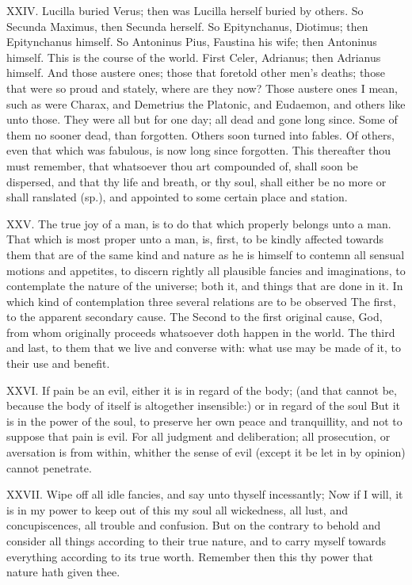 XXIV. Lucilla buried Verus; then was Lucilla herself buried by others.
So Secunda Maximus, then Secunda herself. So Epitynchanus, Diotimus; then
Epitynchanus himself. So Antoninus Pius, Faustina his wife; then Antoninus
himself. This is the course of the world. First Celer, Adrianus; then
Adrianus himself. And those austere ones; those that foretold other men's
deaths; those that were so proud and stately, where are they now? Those
austere ones I mean, such as were Charax, and Demetrius the Platonic, and
Eudaemon, and others like unto those. They were all but for one day; all
dead and gone long since. Some of them no sooner dead, than forgotten.
Others soon turned into fables. Of others, even that which was fabulous,
is now long since forgotten. This thereafter thou must remember, that
whatsoever thou art compounded of, shall soon be dispersed, and that thy
life and breath, or thy soul, shall either be no more or shall ranslated
(sp.), and appointed to some certain place and station.

XXV. The true joy of a man, is to do that which properly belongs unto a
man. That which is most proper unto a man, is, first, to be kindly
affected towards them that are of the same kind and nature as he is
himself to contemn all sensual motions and appetites, to discern rightly
all plausible fancies and imaginations, to contemplate the nature of the
universe; both it, and things that are done in it. In which kind of
contemplation three several relations are to be observed The first, to the
apparent secondary cause. The Second to the first original cause, God,
from whom originally proceeds whatsoever doth happen in the world. The
third and last, to them that we live and converse with: what use may be
made of it, to their use and benefit.

XXVI. If pain be an evil, either it is in regard of the body; (and that
cannot be, because the body of itself is altogether insensible:) or in
regard of the soul But it is in the power of the soul, to preserve her own
peace and tranquillity, and not to suppose that pain is evil. For all
judgment and deliberation; all prosecution, or aversation is from within,
whither the sense of evil (except it be let in by opinion) cannot
penetrate.

XXVII. Wipe off all idle fancies, and say unto thyself incessantly; Now
if I will, it is in my power to keep out of this my soul all wickedness,
all lust, and concupiscences, all trouble and confusion. But on the
contrary to behold and consider all things according to their true nature,
and to carry myself towards everything according to its true worth.
Remember then this thy power that nature hath given thee.

